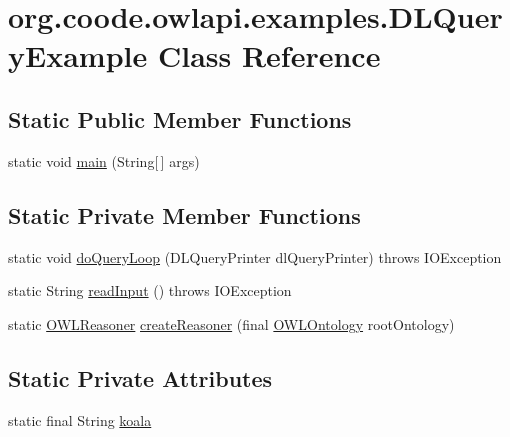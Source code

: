 \hypertarget{classorg_1_1coode_1_1owlapi_1_1examples_1_1_d_l_query_example}{\section{org.\-coode.\-owlapi.\-examples.\-D\-L\-Query\-Example Class Reference}
\label{classorg_1_1coode_1_1owlapi_1_1examples_1_1_d_l_query_example}
}
\subsection*{Static Public Member Functions}
\begin{DoxyCompactItemize}
\item 
static void \hyperlink{classorg_1_1coode_1_1owlapi_1_1examples_1_1_d_l_query_example_a63543a845ef4dbfc550241ef6a115d8b}{main} (String\mbox{[}$\,$\mbox{]} args)
\end{DoxyCompactItemize}
\subsection*{Static Private Member Functions}
\begin{DoxyCompactItemize}
\item 
static void \hyperlink{classorg_1_1coode_1_1owlapi_1_1examples_1_1_d_l_query_example_af5ab0936d8176929e17bf39aadc7944e}{do\-Query\-Loop} (D\-L\-Query\-Printer dl\-Query\-Printer)  throws I\-O\-Exception 
\item 
static String \hyperlink{classorg_1_1coode_1_1owlapi_1_1examples_1_1_d_l_query_example_a183c94ea015c2ad4ad5f7fe31e94aaab}{read\-Input} ()  throws I\-O\-Exception 
\item 
static \hyperlink{interfaceorg_1_1semanticweb_1_1owlapi_1_1reasoner_1_1_o_w_l_reasoner}{O\-W\-L\-Reasoner} \hyperlink{classorg_1_1coode_1_1owlapi_1_1examples_1_1_d_l_query_example_a42d7595764bf45d4d044c3d93b0d86aa}{create\-Reasoner} (final \hyperlink{interfaceorg_1_1semanticweb_1_1owlapi_1_1model_1_1_o_w_l_ontology}{O\-W\-L\-Ontology} root\-Ontology)
\end{DoxyCompactItemize}
\subsection*{Static Private Attributes}
\begin{DoxyCompactItemize}
\item 
static final String \hyperlink{classorg_1_1coode_1_1owlapi_1_1examples_1_1_d_l_query_example_a382847000e0c561ec11b1958165f5642}{koala}
\end{DoxyCompactItemize}


